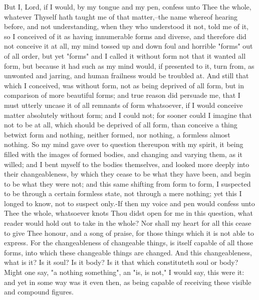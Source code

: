 \documentclass[b5paper,openright,12pt,twoside]{book}
\begin{document}
But I, Lord, if I would, by my tongue and my pen, confess unto Thee the
whole, whatever Thyself hath taught me of that matter,--the name whereof
hearing before, and not understanding, when they who understood it not,
told me of it, so I conceived of it as having innumerable forms and
diverse, and therefore did not conceive it at all, my mind tossed up and
down foul and horrible "forms" out of all order, but yet "forms" and I
called it without form not that it wanted all form, but because it had
such as my mind would, if presented to it, turn from, as unwonted and
jarring, and human frailness would be troubled at. And still that which
I conceived, was without form, not as being deprived of all form, but
in comparison of more beautiful forms; and true reason did persuade me,
that I must utterly uncase it of all remnants of form whatsoever, if
I would conceive matter absolutely without form; and I could not; for
sooner could I imagine that not to be at all, which should be deprived
of all form, than conceive a thing betwixt form and nothing, neither
formed, nor nothing, a formless almost nothing. So my mind gave over to
question thereupon with my spirit, it being filled with the images of
formed bodies, and changing and varying them, as it willed; and I bent
myself to the bodies themselves, and looked more deeply into their
changeableness, by which they cease to be what they have been, and begin
to be what they were not; and this same shifting from form to form, I
suspected to be through a certain formless state, not through a mere
nothing; yet this I longed to know, not to suspect only.-If then my
voice and pen would confess unto Thee the whole, whatsoever knots Thou
didst open for me in this question, what reader would hold out to take
in the whole? Nor shall my heart for all this cease to give Thee honour,
and a song of praise, for those things which it is not able to express.
For the changeableness of changeable things, is itself capable of all
those forms, into which these changeable things are changed. And this
changeableness, what is it? Is it soul? Is it body? Is it that which
constituteth soul or body? Might one say, "a nothing something", an
"is, is not," I would say, this were it: and yet in some way was it even
then, as being capable of receiving these visible and compound figures.
\end{document}
